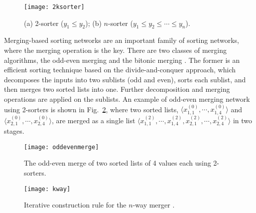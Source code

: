 \documentclass[10pt,journal,cspaper,compsoc]{IEEEtran}
\begin{document}
\begin{figure}[!t]
\centering
\texttt{[image: 2ksorter]}
\caption{(a) 2-sorter ($y_1 \le y_2$); (b) $n$-sorter ($y_1 \le y_2 \le \cdots \le y_n$).}
\label{fig:2ksorter}
\end{figure}

Merging-based sorting networks are an important family of sorting networks, where the merging operation is the key. There are two classes of merging algorithms, the odd-even merging \cite{Bat68sorting} and the bitonic merging \cite{batcher1990bitonic}. The former is an efficient sorting technique based on the divide-and-conquer approach, which decomposes the inputs into two sublists (odd and even), sorts each sublist, and then merges two sorted lists into one. Further decomposition and merging operations are applied on the sublists.
An example of odd-even merging network using 2-sorters is shown in Fig.~\ref{fig:oddeven}, where two sorted lists, $\langle x^{(0)}_{1,1}, \cdots,x^{(0)}_{1,4} \rangle$ and $\langle x^{(0)}_{2,1}, \cdots, x^{(0)}_{2,4} \rangle$, are merged as a single list $\langle x^{(2)}_{1,1}, \cdots,x^{(2)}_{1,4}, x^{(2)}_{2,1}, \cdots, x^{(2)}_{2,4} \rangle$ in two stages.
\begin{figure}[!t]
\centering
\texttt{[image: oddevenmerge]}
\caption{The odd-even merge of two sorted lists of 4 values each using 2-sorters.}
\label{fig:oddeven}
\end{figure}

\begin{figure}[!t]
\centering
\texttt{[image: kway]}
\caption{Iterative construction rule for the $n$-way merger \cite{Lee95multiway}.}
\label{fig:kway}
\end{figure}
\end{document}
